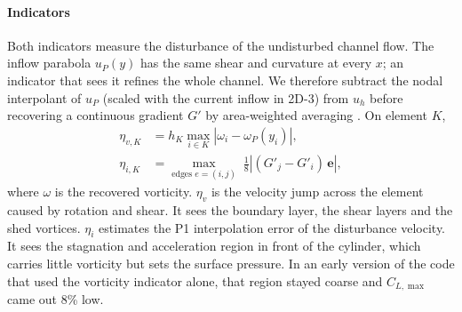 \documentclass[preprint,12pt,number]{elsarticle}
\begin{document}
\paragraph{Indicators}
Both indicators measure the disturbance of the undisturbed channel flow. The inflow parabola
$u_P(y)$ has the same shear and curvature at every $x$; an indicator that sees it refines the
whole channel. We therefore subtract the nodal interpolant of $u_P$ (scaled with the current
inflow in 2D-3) from $u_h$ before recovering a continuous gradient $G'$ by area-weighted
averaging \citep{zienkiewicz1987,zienkiewicz1992}. On element $K$,
\begin{align}
\eta_{v,K} &= h_K \max_{i\in K}\left|\omega_i - \omega_P(y_i)\right|,\\
\eta_{i,K} &= \max_{\text{edges } e = (i,j)}\; \tfrac18\left|(G'_j - G'_i)\,\mathbf{e}\right|,
\end{align}
where $\omega$ is the recovered vorticity. $\eta_v$ is the velocity jump across the element
caused by rotation and shear. It sees the boundary layer, the shear layers and the shed
vortices. $\eta_i$ estimates the P1 interpolation error of the disturbance velocity. It sees
the stagnation and acceleration region in front of the cylinder, which carries little
vorticity but sets the surface pressure. In an early version of the code that used the
vorticity indicator alone, that region stayed coarse and $C_{L,\max}$ came out 8\% low.
\end{document}
